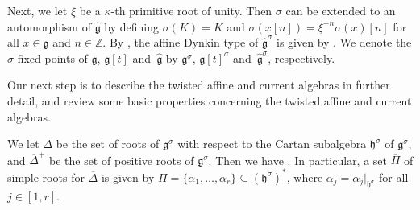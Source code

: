 \documentclass[pdftex]{sigma}
\numberwithin{equation}{section}
\begin{document}
Next, we let $\xi$ be a $\kappa$-th primitive root of unity. Then $\sigma$ can be extended to an automorphism of $\widehat{\mathfrak{g}}$ by defining $\sigma(K)=K$ and $\sigma(x[n])=\xi^{-n}\sigma(x)[n]$ for all $x\in\mathfrak{g}$ and $n\in\mathbb{Z}$. By \cite[Theorem~8.5]{Kac90}, the affine Dynkin type of $\widehat{\mathfrak{g}}^{\sigma}$ is given by . We denote the $\sigma$-fixed points of $\mathfrak{g}$, $\mathfrak{g}[t]$ and~$\widehat{\mathfrak{g}}$ by $\mathfrak{g}^{\sigma}$, $\mathfrak{g}[t]^{\sigma}$ and~$\widehat{\mathfrak{g}}^{\sigma}$, respectively.

Our next step is to describe the twisted affine and current algebras in further detail, and review some basic properties concerning the twisted affine and current algebras.

We let $\overline{\Delta}$ be the set of roots of $\mathfrak{g}^{\sigma}$ with respect to the Cartan subalgebra $\mathfrak{h}^{\sigma}$ of $\mathfrak{g}^{\sigma}$, and $\overline{\Delta}^+$ be the set of positive roots of $\mathfrak{g}^{\sigma}$. Then we have
.
In particular, a set $\overline{\Pi}$ of simple roots for $\overline{\Delta}$ is given by $\Pi=\{\overline{\alpha}_1,\dots,\overline{\alpha}_r\}\subseteq(\mathfrak{h}^{\sigma})^*$, where $\overline{\alpha}_j= \alpha_j|_{\mathfrak{h}^{\sigma}}$ for all $j\in[1,r]$.
\end{document}
